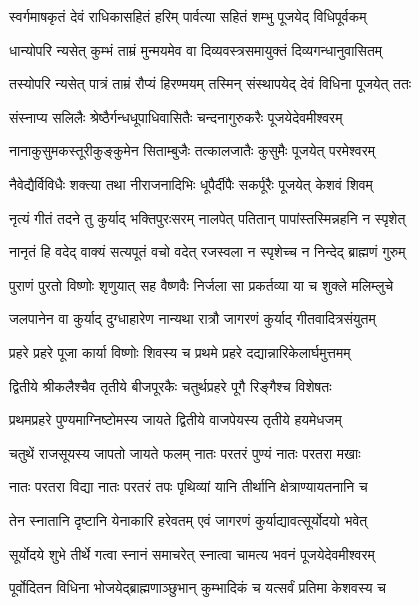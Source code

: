 \twolineshloka
{स्वर्गमाषकृतं देवं राधिकासहितं हरिम्}
{पार्वत्या सहितं शम्भु पूजयेद् विधिपूर्वकम्} %

\twolineshloka
{धान्योपरि न्यसेत् कुम्भं ताम्रं मुन्मयमेव वा}
{दिव्यवस्त्रसमायुक्तं दिव्यगन्धानुवासितम्} %

\twolineshloka
{तस्योपरि न्यसेत् पात्रं ताम्रं रौप्यं हिरण्मयम्}
{तस्मिन् संस्थापयेद् देवं विधिना पूजयेत् ततः} %

\twolineshloka
{संस्नाप्य सलिलैः श्रेष्ठैर्गन्धधूपाधिवासितैः}
{चन्दनागुरुकरैः पूजयेदेवमीश्वरम्} %

\twolineshloka
{नानाकुसुमकस्तूरीकुङ्कुमेन सिताम्बुजैः}
{तत्कालजातैः कुसुमैः पूजयेत् परमेश्वरम्} %

\twolineshloka
{नैवेद्यैर्विविधैः शक्त्या तथा नीराजनादिभिः}
{धूपैर्दीपैः सकर्पूरैः पूजयेत् केशवं शिवम्} %

\twolineshloka
{नृत्यं गीतं तदने तु कुर्याद् भक्तिपुरःसरम्}
{नालपेत् पतितान् पापांस्तस्मिन्नहनि न स्पृशेत्} %

\twolineshloka
{नानृतं हि वदेद् वाक्यं सत्यपूतं वचो वदेत्}
{रजस्वला न स्पृशेच्च न निन्देद् ब्राह्मणं गुरुम्} %

\twolineshloka
{पुराणं पुरतो विष्णोः शृणुयात् सह वैष्णवैः}
{निर्जला सा प्रकर्तव्या या च शुक्ले मलिम्लुचे} %

\twolineshloka
{जलपानेन वा कुर्याद् दुग्धाहारेण नान्यथा}
{रात्रौ जागरणं कुर्याद् गीतवादित्रसंयुतम्} %

\twolineshloka
{प्रहरे प्रहरे पूजा कार्या विष्णोः शिवस्य च}
{प्रथमे प्रहरे दद्यान्नारिकेलार्घमुत्तमम्} %

\twolineshloka
{द्वितीये श्रीकलैश्चैव तृतीये बीजपूरकैः}
{चतुर्थप्रहरे पूगै रिङ्गैश्च विशेषतः} %

\twolineshloka
{प्रथमप्रहरे पुण्यमाग्निष्टोमस्य जायते}
{द्वितीये वाजपेयस्य तृतीये हयमेधजम्} %

\twolineshloka
{चतुथें राजसूयस्य जापतो जायते फलम्}
{नातः परतरं पुण्यं नातः परतरा मखाः} %

\twolineshloka
{नातः परतरा विद्या नातः परतरं तपः}
{पृथिव्यां यानि तीर्थानि क्षेत्राण्यायतनानि च} %

\twolineshloka
{तेन स्नातानि दृष्टानि येनाकारि हरेवतम्}
{एवं जागरणं कुर्याद्यावत्सूर्योदयो भवेत्} %

\twolineshloka
{सूर्योदये शुभे तीर्थे गत्वा स्नानं समाचरेत्}
{स्नात्वा चामत्य भवनं पूजयेदेवमीश्वरम्} %

\twolineshloka
{पूर्वोदितन विधिना भोजयेद्ब्राह्मणाञ्छुभान्}
{कुम्भादिकं च यत्सर्वं प्रतिमा केशवस्य च} %

